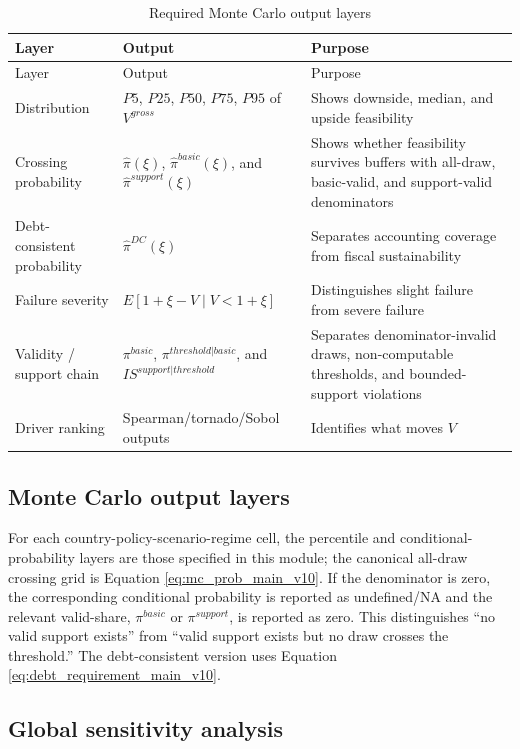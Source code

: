 \documentclass[11pt,a4paper]{article}
\begin{document}
\begin{longtable}{p{}p{}p{}}
\caption{Required Monte Carlo output layers}\label{tab:mc_output_layers}\\
\toprule
Layer & Output & Purpose \\
\midrule
\endfirsthead
\toprule
Layer & Output & Purpose \\
\midrule
\endhead
Distribution & $P5$, $P25$, $P50$, $P75$, $P95$ of $V^{gross}$ & Shows downside, median, and upside feasibility \\
Crossing probability & $\widehat{\pi}(\xi)$, $\widehat{\pi}^{basic}(\xi)$, and $\widehat{\pi}^{support}(\xi)$ & Shows whether feasibility survives buffers with all-draw, basic-valid, and support-valid denominators \\
Debt-consistent probability & $\widehat{\pi}^{DC}(\xi)$ & Separates accounting coverage from fiscal sustainability \\
Failure severity & $E[1+\xi-V\mid V<1+\xi]$ & Distinguishes slight failure from severe failure \\
Validity / support chain & $\pi^{basic}$, $\pi^{threshold|basic}$, and $IS^{support|threshold}$ & Separates denominator-invalid draws, non-computable thresholds, and bounded-support violations \\
Driver ranking & Spearman/tornado/Sobol outputs & Identifies what moves $V$ \\
\bottomrule
\end{longtable}

\subsection{Monte Carlo output layers}

For each country-policy-scenario-regime cell, the percentile and conditional-probability layers are those specified in this module; the canonical all-draw crossing grid is Equation \eqref{eq:mc_prob_main_v10}.
If the denominator is zero, the corresponding conditional probability is reported as undefined/NA and the relevant valid-share, $\pi^{basic}$ or $\pi^{support}$, is reported as zero. This distinguishes ``no valid support exists'' from ``valid support exists but no draw crosses the threshold.'' The debt-consistent version uses Equation \eqref{eq:debt_requirement_main_v10}.

\subsection{Global sensitivity analysis}
\end{document}
